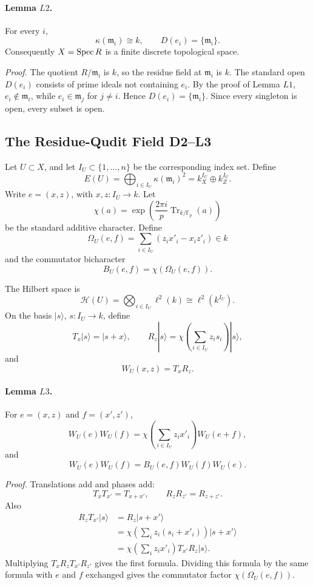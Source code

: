 \paragraph{Lemma \(L2\).}
For every \(i\),
\[
  \kappa(\mathfrak m_i)\cong k,
  \qquad
  D(e_i)=\{\mathfrak m_i\}.
\]
Consequently \(X=\operatorname{Spec} R\) is a finite discrete topological space.

\emph{Proof.}
The quotient \(R/\mathfrak m_i\) is \(k\), so the residue field at
\(\mathfrak m_i\) is \(k\).  The standard open \(D(e_i)\) consists of prime
ideals not containing \(e_i\).  By the proof of Lemma \(L1\), \(e_i\notin
\mathfrak m_i\), while \(e_i\in\mathfrak m_j\) for \(j\ne i\).  Hence
\(D(e_i)=\{\mathfrak m_i\}\).  Since every singleton is open, every subset is
open.

\subsection{The Residue-Qudit Field D2--L3}

Let \(U\subset X\), and let \(I_U\subset\{1,\ldots,n\}\) be the corresponding
index set.  Define
\[
  E(U)=\bigoplus_{i\in I_U}\kappa(\mathfrak m_i)^2
      =k_X^{I_U}\oplus k_Z^{I_U}.
\]
Write \(e=(x,z)\), with \(x,z:I_U\to k\).  Let
\[
  \chi(a)=\exp\!\left(\frac{2\pi i}{p}
  \operatorname{Tr}_{k/\mathbb F_p}(a)\right)
\]
be the standard additive character.  Define
\[
  \Omega_U(e,f)=\sum_{i\in I_U}(z_ix'_i-x_iz'_i)\in k
\]
and the commutator bicharacter
\[
  B_U(e,f)=\chi(\Omega_U(e,f)).
\]

The Hilbert space is
\[
  \mathcal H(U)=\bigotimes_{i\in I_U}\ell^2(k)
  \cong \ell^2(k^{I_U}).
\]
On the basis \(|s\rangle\), \(s:I_U\to k\), define
\[
  T_x|s\rangle=|s+x\rangle,\qquad
  R_z|s\rangle=\chi\!\left(\sum_{i\in I_U}z_is_i\right)|s\rangle,
\]
and
\[
  W_U(x,z)=T_xR_z .
\]

\paragraph{Lemma \(L3\).}
For \(e=(x,z)\) and \(f=(x',z')\),
\[
  W_U(e)W_U(f)
  =
  \chi\!\left(\sum_{i\in I_U}z_ix'_i\right)W_U(e+f),
\]
and
\[
  W_U(e)W_U(f)=B_U(e,f)W_U(f)W_U(e).
\]

\emph{Proof.}
Translations add and phases add:
\[
  T_xT_{x'}=T_{x+x'},\qquad R_zR_{z'}=R_{z+z'}.
\]
Also
\[
\begin{aligned}
  R_zT_{x'}|s\rangle
  &=R_z|s+x'\rangle\\
  &=\chi\!\left(\sum_i z_i(s_i+x'_i)\right)|s+x'\rangle\\
  &=\chi\!\left(\sum_i z_ix'_i\right)T_{x'}R_z|s\rangle .
\end{aligned}
\]
Multiplying \(T_xR_zT_{x'}R_{z'}\) gives the first formula.  Dividing this
formula by the same formula with \(e\) and \(f\) exchanged gives the
commutator factor \(\chi(\Omega_U(e,f))\).

